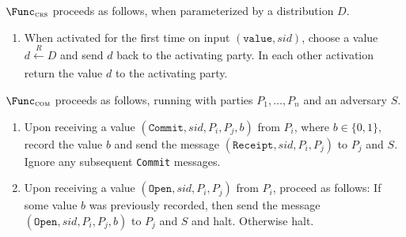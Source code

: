 \begin{func}
    $\Func_{\textsc{crs}}$ proceeds as follows, when parameterized by a distribution $D$.
    \begin{enumerate}
        \item When activated for the first time on input $(\texttt{value}, sid)$, choose a value $d \xleftarrow[]{R} D$ and send $d$ back to the activating party. In each other activation return the value $d$ to the activating party.
    \end{enumerate}
\end{func}

%

\begin{func}
    $\Func_{\textsc{com}}$ proceeds as follows, running with parties $P_1, \ldots, P_n$ and an adversary $S$.
    \begin{enumerate}
        \item Upon receiving a value $(\texttt{Commit}, sid, P_i, P_j, b)$ from $P_i$, where $b \in \{ 0, 1 \}$, record the value $b$ and send the message $(\texttt{Receipt}, sid, P_i, P_j)$ to $P_j$ and $S$. Ignore any subsequent \texttt{Commit} messages.

        \item Upon receiving a value $(\texttt{Open}, sid, P_i, P_j)$ from $P_i$, proceed as follows: If some value $b$ was previously recorded, then send the message $(\texttt{Open}, sid, P_i, P_j, b)$ to $P_j$ and $S$ and halt. Otherwise halt.
    \end{enumerate}
\end{func}

%
